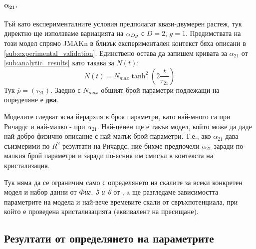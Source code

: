 \paragraph{$\boldsymbol{\alpha_{21}}$.} Тъй като експерименталните условия предполагат квази-двумерен растеж, тук директно ще използваме вариацията на $\alpha_{Dg}$ с $D = 2$, $g = 1$. Предимствата на този модел спрямо JMAKn в близък експериментален контекст  бяха описани в \autoref{sub:experimental_validation}. Единствено остава да запишем кривата за $\alpha_{21}$ от \autoref{sub:analytic_results} като такава за $N(t)$:
\begin{equation}
    \label{eq:alpha21_intform_n}
    N(t) = N_{max} \tanh^2{\left( 2 \frac{t}{\tau_{21}} \right)}
\end{equation}
Тук $\overline{p} = (\tau_{21})$. Заедно с $N_{max}$ общият брой параметри подлежащи на определяне е \textbf{два}.

Моделите следват ясна йерархия в броя параметри, като най-много са при Ричардс и най-малко - при $\alpha_{21}$. Най-ценен ще е такъв модел, който може да даде най-добро физично описание с най-малък брой параметри. Т.е., ако $\alpha_{21}$ дава съизмерими по $R^2$ резултати на Ричардс, ние бихме предпочели $\alpha_{21}$ заради по-малкия брой параметри и заради по-ясния им смисъл в контекста на кристализация.

Тук няма да се ограничим само с определянето на скалите за всеки конкретен модел и набор данни от \textit{Фиг. 5 и 6} от \cite{Markov1976}, a ще разгледаме зависимостта параметрите на модела и най-вече времевите скали от свръхпотенциала, при който е проведена кристализацията (еквивалент на пресищане).

\subsection{Резултати от определянето на параметрите}
